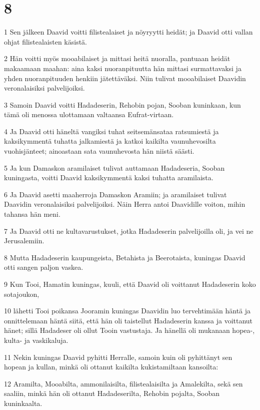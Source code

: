 \chapter{8}

\par 1 Sen jälkeen Daavid voitti filistealaiset ja nöyryytti heidät; ja Daavid otti vallan ohjat filistealaisten käsistä.
\par 2 Hän voitti myös mooabilaiset ja mittasi heitä nuoralla, pantuaan heidät makaamaan maahan: aina kaksi nuoranpituutta hän mittasi surmattavaksi ja yhden nuoranpituuden henkiin jätettäväksi. Niin tulivat mooabilaiset Daavidin veronalaisiksi palvelijoiksi.
\par 3 Samoin Daavid voitti Hadadeserin, Rehobin pojan, Sooban kuninkaan, kun tämä oli menossa ulottamaan valtaansa Eufrat-virtaan.
\par 4 Ja Daavid otti häneltä vangiksi tuhat seitsemänsataa ratsumiestä ja kaksikymmentä tuhatta jalkamiestä ja katkoi kaikilta vaunuhevosilta vuohisjänteet; ainoastaan sata vaunuhevosta hän niistä säästi.
\par 5 Ja kun Damaskon aramilaiset tulivat auttamaan Hadadeseria, Sooban kuningasta, voitti Daavid kaksikymmentä kaksi tuhatta aramilaista.
\par 6 Ja Daavid asetti maaherroja Damaskon Aramiin; ja aramilaiset tulivat Daavidin veronalaisiksi palvelijoiksi. Näin Herra antoi Daavidille voiton, mihin tahansa hän meni.
\par 7 Ja Daavid otti ne kultavarustukset, jotka Hadadeserin palvelijoilla oli, ja vei ne Jerusalemiin.
\par 8 Mutta Hadadeserin kaupungeista, Betahista ja Beerotaista, kuningas Daavid otti sangen paljon vaskea.
\par 9 Kun Tooi, Hamatin kuningas, kuuli, että Daavid oli voittanut Hadadeserin koko sotajoukon,
\par 10 lähetti Tooi poikansa Jooramin kuningas Daavidin luo tervehtimään häntä ja onnittelemaan häntä siitä, että hän oli taistellut Hadadeserin kanssa ja voittanut hänet; sillä Hadadeser oli ollut Tooin vastustaja. Ja hänellä oli mukanaan hopea-, kulta- ja vaskikaluja.
\par 11 Nekin kuningas Daavid pyhitti Herralle, samoin kuin oli pyhittänyt sen hopean ja kullan, minkä oli ottanut kaikilta kukistamiltaan kansoilta:
\par 12 Aramilta, Mooabilta, ammonilaisilta, filistealaisilta ja Amalekilta, sekä sen saaliin, minkä hän oli ottanut Hadadeserilta, Rehobin pojalta, Sooban kuninkaalta.
